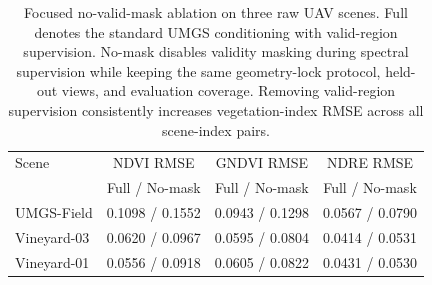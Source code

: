 \begin{table}[t]
    \caption{Focused no-valid-mask ablation on three raw UAV scenes. Full denotes the standard UMGS conditioning with valid-region supervision. No-mask disables validity masking during spectral supervision while keeping the same geometry-lock protocol, held-out views, and evaluation coverage. Removing valid-region supervision consistently increases vegetation-index RMSE across all scene-index pairs.}
    \label{tab:raw-conditioning-ablation}
    \centering
    \scriptsize
    \setlength{\tabcolsep}{3pt}
    \begin{tabular}{lccc}
        \toprule
        Scene & NDVI RMSE & GNDVI RMSE & NDRE RMSE \\
        & Full / No-mask & Full / No-mask & Full / No-mask \\
        \midrule
        UMGS-Field & 0.1098 / 0.1552 & 0.0943 / 0.1298 & 0.0567 / 0.0790 \\
        Vineyard-03 & 0.0620 / 0.0967 & 0.0595 / 0.0804 & 0.0414 / 0.0531 \\
        Vineyard-01 & 0.0556 / 0.0918 & 0.0605 / 0.0822 & 0.0431 / 0.0530 \\
        \bottomrule
    \end{tabular}
\end{table}
